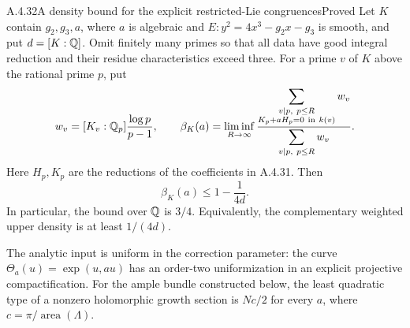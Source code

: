 \begin{result}{A.4.32}{A density bound for the explicit restricted-Lie congruences}{Proved}
Let $K$ contain $g_2,g_3,a$, where $a$ is algebraic and
$E:y^2=4x^3-g_2x-g_3$ is smooth, and put $d=[K:\mathbb Q]$.
Omit finitely many primes so that all data have good integral
reduction and their residue characteristics exceed three.
For a prime $v$ of $K$ above the rational prime $p$, put
\[
 w_v=[K_v:\mathbb Q_p]\frac{\log p}{p-1},\qquad
 \beta_K(a)=\liminf_{R\to\infty}
 \frac{\displaystyle\sum_{\substack{v\mid p,\ p\le R\\
                         K_p+aH_p=0\ {\rm in}\ k(v)}}w_v}
      {\displaystyle\sum_{v\mid p,\ p\le R}w_v}.
\]
Here $H_p,K_p$ are the reductions of the coefficients in A.4.31.
Then
\[
 \boxed{\qquad \beta_K(a)\le 1-\frac1{4d}.\qquad}
\]
In particular, the bound over $\mathbb Q$ is $3/4$. Equivalently,
the complementary weighted upper density is at least $1/(4d)$.

The analytic input is uniform in the correction parameter:
the curve $\Theta_a(u)=\exp(u,au)$ has an order-two
uniformization in an explicit projective compactification.
For the ample bundle constructed below, the least quadratic
type of a nonzero holomorphic growth section is $Nc/2$ for
every $a$, where $c=\pi/\operatorname{area}(\Lambda)$.
\end{result}
